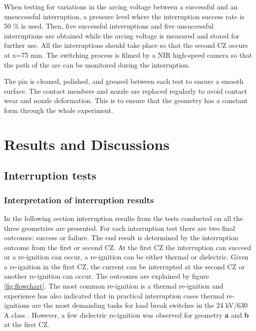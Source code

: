 \documentclass[10pt,b5paper,twoside]{article}
\begin{document}
When testing for variations in the arcing voltage between a successful and an unsuccessful interruption, a pressure level where the interruption success rate is 50 \% is used. Then, five successful interruptions and five unsuccessful interruptions are obtained while the arcing voltage is measured and stored for further use. All the interruptions should take place so that the second CZ occurs at x=75 mm. The switching process is filmed by a NIR high-speed camera so that the path of the arc can be monitored during the interruption.

The pin is cleaned, polished, and greased between each test to ensure a smooth surface. The contact members and nozzle are replaced regularly to avoid contact wear and nozzle deformation. This is to ensure that the geometry has a constant form through the whole experiment.
\cleardoublepage

\section{Results and Discussions}
\subsection{Interruption tests} \label{sec:interruptionTests}
\subsubsection{Interpretation of interruption results}
In the following section interruption results from the tests conducted on all the three geometries are presented. For each interruption test there are two final outcomes: success or failure. The end result is determined by the interruption outcome from the first or second CZ. At the first CZ the interruption can succeed or a re-ignition can occur, a re-ignition can be either thermal or dielectric. Given a re-ignition in the first CZ, the current can be interrupted at the second CZ or another re-ignition can occur. The outcomes are explained by figure \ref{fig:flowchart}. The most common re-ignition is a thermal re-ignition and experience has also indicated that in practical interruption cases thermal re-ignitions are the most demanding tasks for load break switches in the 24 kV/630 A class \cite{bib:AFIMVLBA}. However, a few dielectric re-ignition was observed for geometry \textbf{a} and \textbf{b} at the first CZ. 
\end{document}

